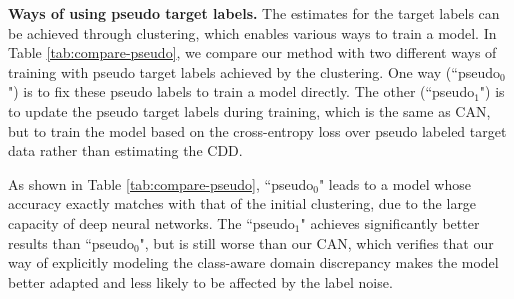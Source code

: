 \documentclass[10pt,twocolumn,letterpaper]{article}
\begin{document}
\setlength{\tabcolsep}{2.5pt}
\begin{table}[ht]
\small
\begin{center}
\end{center}
\caption{\label{tab:compare-pseudo}
Comparison with different ways of utilizing pseudo target labels.The ``pseudo$_0$" means training with pseudo target labels (achieved by our initial clustering) directly. The ``pseudo$_1$" is to alternatively update target labels through clustering 
and minimize the cross-entropy loss on pseudo labeled target data. In ``pseudo$_1$", 
the cross-entropy loss on source data is also minimized.
}
\vspace{-5mm}
\end{table}
\textbf{Ways of using pseudo target labels.}
The estimates for the target labels can be achieved through clustering, 
which enables various ways to train a model.
In Table \ref{tab:compare-pseudo}, we compare our method with two different ways of training
with pseudo target labels achieved by the clustering.
One way (``pseudo$_0$") is to fix these pseudo labels to train a model directly.
The other (``pseudo$_1$") is to update the pseudo target labels during training,
which is the same as CAN, but to train the model based on the cross-entropy loss
over pseudo labeled target data rather than estimating the CDD.

As shown in Table \ref{tab:compare-pseudo}, ``pseudo$_0$" leads to a model 
whose accuracy exactly matches with that of the initial clustering, 
due to the large capacity of deep neural networks.
The ``pseudo$_1$" achieves significantly better results than ``pseudo$_0$", 
but is still worse than our CAN,
which verifies that our way of explicitly modeling the class-aware domain discrepancy
makes the model better adapted and less likely to be affected by the label noise.
\end{document}
